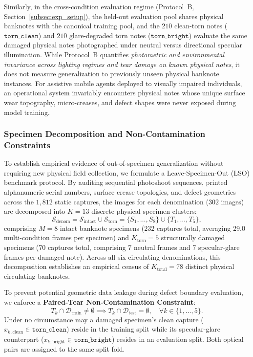 \documentclass[final,5p,times,twocolumn,authoryear]{elsarticle}
\begin{document}
Similarly, in the cross-condition evaluation regime (Protocol~B, Section~\ref{subsec:exp_setup}), the held-out evaluation pool shares physical banknotes with the canonical training pool, and the $210$ clean-torn notes ($\texttt{torn\_clean}$) and $210$ glare-degraded torn notes ($\texttt{torn\_bright}$) evaluate the same damaged physical notes photographed under neutral versus directional specular illumination. While Protocol~B quantifies \textit{photometric and environmental invariance across lighting regimes and tear damage on known physical notes}, it does not measure generalization to previously unseen physical banknote instances. For assistive mobile agents deployed to visually impaired individuals, an operational system invariably encounters physical notes whose unique surface wear topography, micro-creases, and defect shapes were never exposed during model training.

\subsubsection{Specimen Decomposition and Non-Contamination Constraints}
To establish empirical evidence of out-of-specimen generalization without requiring new physical field collection, we formulate a Leave-Specimen-Out (LSO) benchmark protocol. By auditing sequential photoshoot sequences, printed alphanumeric serial numbers, surface crease topologies, and defect geometries across the $1{,}812$ static captures, the images for each denomination ($302$ images) are decomposed into $K = 13$ discrete physical specimen clusters:
\begin{equation}
\mathcal{S}_{\text{denom}} = \mathcal{S}_{\text{intact}} \cup \mathcal{S}_{\text{torn}} = \{S_1, \dots, S_8\} \cup \{T_1, \dots, T_5\},
\end{equation}
comprising $M = 8$ intact banknote specimens ($232$ captures total, averaging $29.0$ multi-condition frames per specimen) and $K_{\text{torn}} = 5$ structurally damaged specimens ($70$ captures total, comprising $7$ neutral frames and $7$ specular-glare frames per damaged note). Across all six circulating denominations, this decomposition establishes an empirical census of $K_{\text{total}} = 78$ distinct physical circulating banknotes.

To prevent potential geometric data leakage during defect boundary evaluation, we enforce a \textbf{Paired-Tear Non-Contamination Constraint}:
\begin{equation}
T_k \cap \mathcal{D}_{\text{train}} \neq \emptyset \implies T_k \cap \mathcal{D}_{\text{test}} = \emptyset, \quad \forall k \in \{1, \dots, 5\}.
\end{equation}
Under no circumstance may a damaged specimen's clean capture ($x_{k, \text{clean}} \in \texttt{torn\_clean}$) reside in the training split while its specular-glare counterpart ($x_{k, \text{bright}} \in \texttt{torn\_bright}$) resides in an evaluation split. Both optical pairs are assigned to the same split fold.
\end{document}
